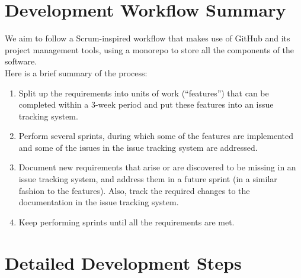 \documentclass[fullpage]{article}
\newcommand{\be}{\begin{enumerate}}
\newcommand{\ee}{\end{enumerate}}
\begin{document}
\section{Development Workflow Summary}

We aim to follow a Scrum-inspired workflow that makes use of GitHub and its project management tools, using a monorepo to store all the components of the software. \\

\noindent Here is a brief summary of the process:
\be
\item Split up the requirements into units of work (“features”) that can be completed within a 3-week period and put these features into an issue tracking system.
\item Perform several sprints, during which some of the features are implemented and some of the issues in the issue tracking system are addressed.
\item Document new requirements that arise or are discovered to be missing in an issue tracking system, and address them in a future sprint (in a similar fashion to the features). Also, track the required changes to the documentation in the issue tracking system.
\item Keep performing sprints until all the requirements are met.
\ee


\section{Detailed Development Steps}
\end{document}
